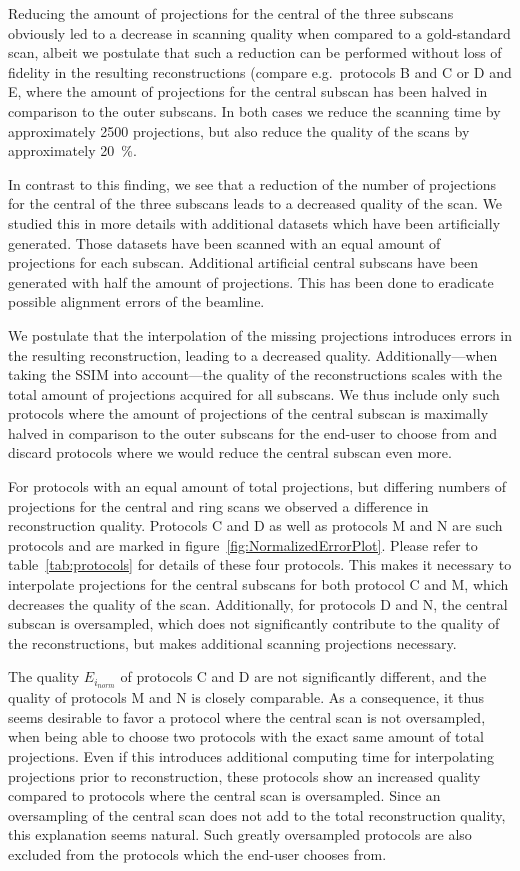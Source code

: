 Reducing the amount of projections for the central of the three subscans obviously led to a decrease in scanning quality when compared to a gold-standard scan, albeit we postulate that such a reduction can be performed without loss of fidelity in the resulting reconstructions (compare e.g.\  protocols B and C or D and E, where the amount of projections for the central subscan has been halved in comparison to the outer subscans. In both cases we reduce the scanning time by approximately 2500 projections, but also reduce the quality of the scans by approximately \SI{20}{\percent}.

In contrast to this finding, we see that a reduction of the number of projections for the central of the three subscans leads to a decreased quality of the scan. We studied this in more details with additional datasets which have been artificially generated. Those datasets have been scanned with an equal amount of projections for each subscan. Additional artificial central subscans have been generated with half the amount of projections. This has been done to eradicate possible alignment errors of the beamline.

We postulate that the interpolation of the missing projections introduces errors in the resulting reconstruction, leading to a decreased quality. Additionally---when taking the SSIM into account---the quality of the reconstructions scales with the total amount of projections acquired for all subscans. We thus include only such protocols where the amount of projections of the central subscan is maximally halved in comparison to the outer subscans for the end-user to choose from and discard protocols where we would reduce the central subscan even more.

For protocols with an equal amount of total projections, but differing numbers of projections for the central and ring scans we observed a difference in reconstruction quality. Protocols C and D as well as protocols M and N are such protocols and are marked in figure~\ref{fig:NormalizedErrorPlot}. Please refer to table~\ref{tab:protocols} for details of these four protocols. This makes it necessary to interpolate projections for the central subscans for both protocol C and M, which decreases the quality of the scan. Additionally, for protocols D and N, the central subscan is oversampled, which does not significantly contribute to the quality of the reconstructions, but makes additional scanning projections necessary. 

The quality $E_{i_{norm}}$ of protocols C and D are not significantly different, and the quality of protocols M and N is closely comparable. As a consequence, it thus seems desirable to favor a protocol where the central scan is not oversampled, when being able to choose two protocols with the exact same amount of total projections. Even if this introduces additional computing time for interpolating projections prior to reconstruction, these protocols show an increased quality compared to protocols where the central scan is oversampled. Since an oversampling of the central scan does not add to the total reconstruction quality, this explanation seems natural. Such greatly oversampled protocols are also excluded from the protocols which the end-user chooses from.

